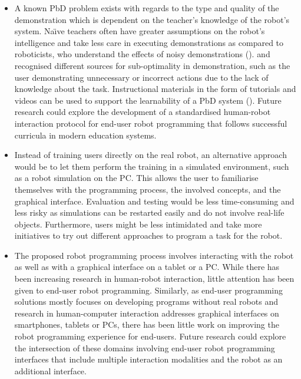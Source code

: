 \begin{itemize}
	\item {
		A known PbD problem exists with regards to the type and quality of the demonstration which is dependent on the teacher's knowledge of the robot's system.
		Na\"{\i}ve teachers often have greater assumptions on the robot's intelligence and take less care in executing demonstrations as compared to roboticists, who understand the effects of noisy demonstrations (\cite{suay2012practical}).
		\cite{chen2003programing} and \cite{kaiser1995obtaining} recognised different sources for sub-optimality in demonstration, such as the user demonstrating unnecessary or incorrect actions due to the lack of knowledge about the task.
		Instructional materials in the form of tutorials and videos can be used to support the learnability of a PbD system (\cite{cakmak2014teaching}).
		Future research could explore the development of a standardised human-robot interaction protocol for end-user robot programming that follows successful curricula in modern education systems.
	}
	\item {
	Instead of training users directly on the real robot, an alternative approach would be to let them perform the training in a simulated environment, such as a robot simulation on the PC.
	This allows the user to familiarise themselves with the programming process, the involved concepts, and the graphical interface.
	Evaluation and testing would be less time-consuming and less risky as simulations can be restarted easily and do not involve real-life objects.
	Furthermore, users might be less intimidated and take more initiatives to try out different approaches to program a task for the robot.
	}
	\item {%
		The proposed robot programming process involves interacting with the robot as well as with a graphical interface on a tablet or a PC. 
	While there has been increasing research in human-robot interaction, little attention has been given to end-user robot programming.
	Similarly, as end-user programming solutions mostly focuses on developing programs without real robots and research in human-computer interaction addresses graphical interfaces on smartphones, tablets or PCs,
	there has been little work on improving the robot programming experience for end-users.
	Future research could explore the intersection of these domains involving end-user robot programming interfaces that include multiple interaction modalities and the robot as an additional interface.}

\end{itemize}


